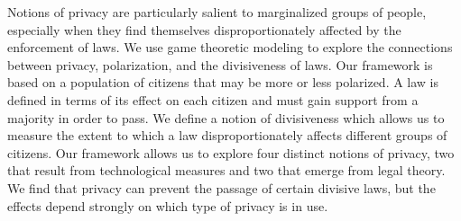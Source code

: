 %
Notions of privacy are particularly salient to marginalized groups of people, especially when they find themselves disproportionately affected by the enforcement of laws.  We use game theoretic modeling to explore the connections between privacy, polarization, and the divisiveness of laws.  Our framework is based on a population of citizens that may be more or less polarized.  A law is defined in terms of its effect on each citizen and must gain support from a majority in order to pass.  We define a notion of divisiveness which allows us to measure the extent to which a law disproportionately affects different groups of citizens.  Our framework allows us to explore four distinct notions of privacy, two that result from technological measures and two that emerge from legal theory.  We find that privacy can prevent the passage of certain divisive laws, but the effects depend strongly on which type of privacy is in use.

